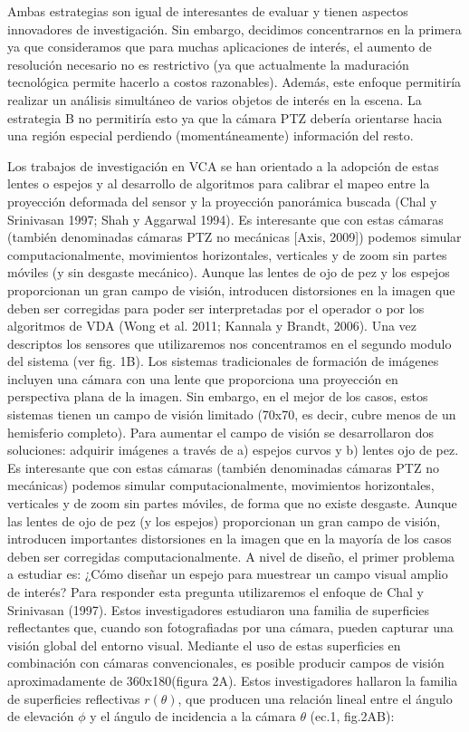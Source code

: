 \documentclass[12pt,a4paper]{article}
\begin{document}
Ambas estrategias son igual de interesantes de evaluar y tienen aspectos innovadores de investigación. Sin embargo, decidimos concentrarnos en la primera ya que consideramos que para muchas aplicaciones de interés, el aumento de resolución necesario no es restrictivo (ya que actualmente la maduración tecnológica permite hacerlo a costos razonables). Además, este enfoque permitiría realizar un análisis simultáneo de varios objetos de interés en la escena. La estrategia B no permitiría esto ya que la cámara PTZ debería orientarse hacia una región especial perdiendo (momentáneamente) información del resto.

Los trabajos de investigación en VCA se han orientado a la adopción de estas lentes o espejos y al desarrollo de algoritmos para calibrar el mapeo entre la proyección deformada del sensor y la proyección panorámica buscada (Chal y Srinivasan 1997; Shah y Aggarwal 1994). Es interesante que con estas cámaras (también denominadas cámaras PTZ no mecánicas [Axis, 2009]) podemos simular computacionalmente, movimientos horizontales, verticales y  de zoom sin partes móviles (y sin desgaste mecánico). Aunque las lentes de ojo de pez y los espejos proporcionan un gran campo de visión, introducen distorsiones en la imagen que deben ser corregidas para poder ser interpretadas por el operador o por los algoritmos de VDA (Wong et al. 2011; Kannala y Brandt, 2006).
Una vez descriptos los sensores que utilizaremos nos concentramos en el segundo modulo del sistema (ver fig. 1B). 
Los sistemas tradicionales de formación de imágenes incluyen una cámara con una lente que proporciona una proyección en perspectiva plana de la imagen. Sin embargo, en el mejor de los casos, estos sistemas tienen un campo de visión limitado (70\degree x70\degree, es decir, cubre menos de un hemisferio completo).  Para aumentar el campo de visión se desarrollaron dos soluciones: adquirir imágenes a través de a) espejos curvos y b) lentes ojo de pez.
Es interesante que con estas cámaras (también denominadas cámaras PTZ no mecánicas) podemos simular computacionalmente, movimientos horizontales, verticales y  de zoom sin partes móviles, de forma que no existe desgaste.  Aunque las lentes de ojo de pez (y los espejos) proporcionan un gran campo de visión, introducen importantes distorsiones en la imagen que en la mayoría de los casos deben ser corregidas computacionalmente.
A nivel de diseño, el primer problema a estudiar es: ¿Cómo diseñar un espejo para muestrear un campo visual amplio de interés?
Para responder esta pregunta utilizaremos el enfoque de Chal y Srinivasan (1997). Estos investigadores  estudiaron una familia de superficies reflectantes que, cuando son fotografiadas por una cámara, pueden capturar una visión global del entorno visual. Mediante el uso de estas superficies en combinación con cámaras convencionales, es posible producir campos de visión aproximadamente de 360\degree x180\degree (figura 2A). 
Estos investigadores hallaron la familia de superficies reflectivas $r(\theta)$, que producen una relación lineal entre el ángulo de elevación $\phi$ y el ángulo de incidencia a la cámara $\theta$ (ec.1, fig.2AB):
\end{document}
